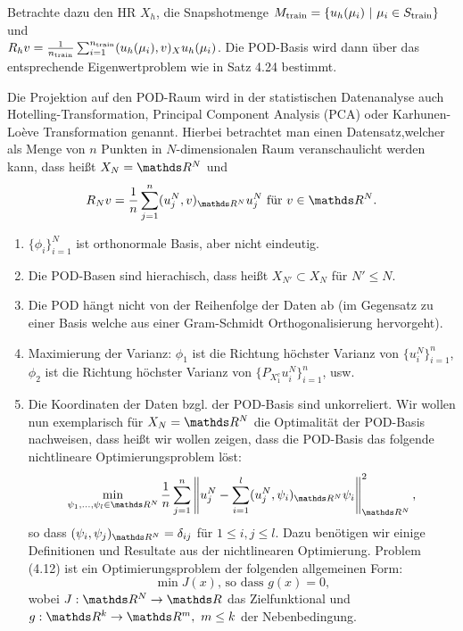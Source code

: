 Betrachte dazu den HR $X_h$, die Snapshotmenge $M_{\operatorname{train}} = \left\{ u_h(\mu_i)~|~ \mu_i\in S_{\operatorname{train}}\right\}$ und\\ $R_hv = \frac{1}{n_{\operatorname{train}}} \sum_{i=1}^{n_{\operatorname{train}}} (u_h(\mu_i),v)_{X} u_h(\mu_i)$. 
Die POD-Basis wird dann über das entsprechende Eigenwertproblem wie in Satz 4.24 bestimmt.

Die Projektion auf den POD-Raum wird in der statistischen Datenanalyse auch Hotelling-Transformation, Principal Component Analysis (PCA) oder Karhunen-Lo\`{e}ve Transformation genannt. Hierbei betrachtet man einen Datensatz,welcher als Menge von $n$ Punkten in $N$-dimensionalen Raum veranschaulicht werden kann, dass heißt $X_N=\R^N$ und
\[
R_Nv = \frac{1}{n} \sum_{j=1}^n (u_j^N,v)_{\R^N} u_j^N \text{ für } v\in \R^N.
\]

\begin{enumerate}[(1)]
	\item $\{\phi_i\}_{i=1}^N$ ist orthonormale Basis, aber nicht eindeutig.
	\item Die POD-Basen sind  hierachisch, dass heißt $X_{N'}\subset X_N$ für $N'\le N$.
	\item Die POD hängt nicht von der Reihenfolge der Daten ab (im Gegensatz zu einer Basis welche aus einer Gram-Schmidt Orthogonalisierung hervorgeht).
	\item Maximierung der Varianz: $\phi_1$ ist die Richtung höchster Varianz von $\{u_i^N\}_{i=1}^n$, $\phi_2$ ist die Richtung höchster Varianz von $\{ P_{X_1^c} u_i^N\}_{i=1}^n$, usw.
	\item Die Koordinaten der Daten bzgl. der POD-Basis sind unkorreliert.
	Wir wollen nun exemplarisch für $X_N=\R^N$ die Optimalität der POD-Basis nachweisen, dass heißt wir wollen zeigen, dass die POD-Basis das folgende nichtlineare Optimierungsproblem löst:
	\begin{align}
	\min\limits_{\psi_1\dt{,}\psi_l\in\R^N} \frac{1}{n} \sum_{j=1}^n \norm{u_j^N - \sum_{i=1}^l (u_j^N,\psi_i)_{\R^N}\psi_i}_{\R^N}^2,
	\end{align}
	so dass $(\psi_i,\psi_j)_{\R^N} = \delta_{ij}$ für $1\le i,j\le l$.
	Dazu benötigen wir einige Definitionen und Resultate aus der nichtlinearen Optimierung.
	Problem (4.12) ist ein Optimierungsproblem der folgenden allgemeinen Form:
	\[
	\min J(x) \text{, so dass } g(x) = 0, \tag*{(Op)}
	\]
	wobei $J:\R^N\to \R$ das Zielfunktional und $g:\R^k\to \R^m,~m\le k$ der Nebenbedingung.
\end{enumerate}

